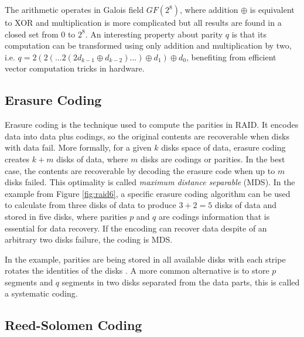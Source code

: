 The arithmetic operates in Galois field $GF(2^8)$, where addition $\oplus$ is equivalent to XOR and multiplication is more complicated but all results are found in a closed set from 0 to $2^8$. An interesting property about parity $q$ is that its computation can be transformed using only addition and multiplication by two, i.e. $q = 2 (2(...2(2d_{k-1} \oplus d_{k-2})...) \oplus d_1) \oplus d_0$, benefiting from efficient vector computation tricks in hardware.




\subsection{Erasure Coding}

Erasure coding is the technique used to compute the parities in RAID. It encodes data into data plus codings, so the original contents are recoverable when disks with data fail. More formally, for a given $k$ disks space of data, erasure coding creates $k+m$ disks of data, where $m$ disks are codings or parities. In the best case, the contents are recoverable by decoding the erasure code when up to $m$ disks failed. This optimality is called \textit{maximum distance
separable} (MDS). In the example from Figure \ref{fig:raid6}, a specific erasure coding algorithm can be used to calculate from three disks of data to produce $3+2=5$ disks of data and stored in five disks, where parities $p$ and $q$ are codings information that is essential for data recovery. If the encoding can recover data despite of an arbitrary two disks failure, the coding is MDS. 

In the example, parities are being stored in all available disks with each stripe rotates the identities of the disks . A more common alternative is to store $p$ segments and $q$ segments in two disks separated from the data parts, this is called a systematic coding.


%


\subsection{Reed-Solomen Coding}

